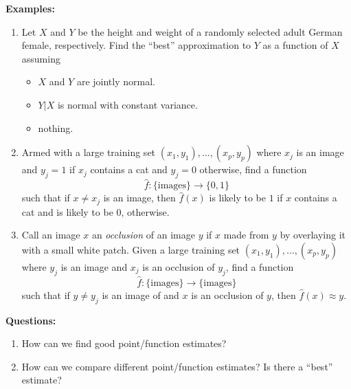 \documentclass[12pt]{amsart}
\renewcommand{\hat}{\widehat}
\newcommand{\RR}{\mathbb{R}}
\newcommand{\lra}{\longrightarrow}
\newcommand{\vX}{\boldsymbol{X}}
\begin{document}
\textbf{Examples:}
\begin{enumerate}
\item Let $X$ and $Y$ be the height and weight of a randomly selected adult German female, respectively.
Find the ``best'' approximation to $Y$  as a function of $X$ assuming
\begin{itemize}
    \item $X$ and $Y$ are jointly normal.
    \item $Y|X$ is normal with constant variance.
    \item nothing.
\end{itemize}


\item Armed with a large training set $(x_1, y_1),\ldots,(x_p, y_p)$ where $x_j$ is an image and
$y_j=1$ if $x_j$ contains a cat and $y_j=0$ otherwise, find a function
\[
    \hat{f}:\{\text{images}\}\lra \{0,1\}
\]
such that if $x\neq x_j$ is an image, then $\hat f(x)$ is likely to be $1$ if $x$ contains a cat and is likely to be $0$, otherwise.
\item Call an image $x$ an \emph{occlusion} of an image $y$ if $x$ made from $y$ by overlaying it with a small white patch.
Given a large training set $(x_1, y_1),\ldots,(x_p, y_p)$ where $y_j$ is an image and $x_j$ is an occlusion of $y_j$,
find a function
$$
\hat{f}:\{\text{images}\}\lra \{\text{images}\}
$$
such that if $y\neq y_j$ is an image of and $x$ is an occlusion of $y$, then $\hat f(x)\approx y$.
\end{enumerate}

\textbf{Questions:}
\begin{enumerate}
    \item How can we find good point/function estimates?
    \item How can we compare different point/function estimates? Is there a ``best'' estimate?
\end{enumerate}
\end{document}
